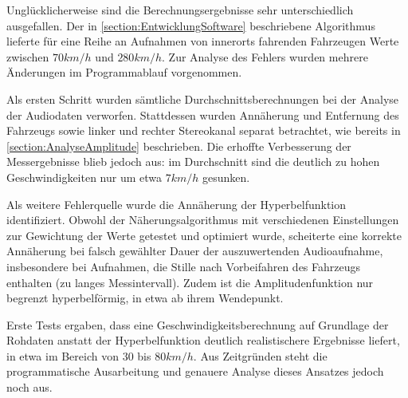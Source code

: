 Unglücklicherweise sind die Berechnungsergebnisse sehr unterschiedlich ausgefallen. Der in \autoref{section:EntwicklungSoftware} beschriebene Algorithmus lieferte für eine Reihe an Aufnahmen von innerorts fahrenden Fahrzeugen Werte zwischen \(70 km/h\) und \(280 km/h\). Zur Analyse des Fehlers wurden mehrere Änderungen im Programmablauf vorgenommen.

Als ersten Schritt wurden sämtliche Durchschnittsberechnungen bei der Analyse der Audiodaten verworfen. Stattdessen wurden Annäherung und Entfernung des Fahrzeugs sowie linker und rechter Stereokanal separat betrachtet, wie bereits in \autoref{section:AnalyseAmplitude} beschrieben. Die erhoffte Verbesserung der Messergebnisse blieb jedoch aus: im Durchschnitt sind die deutlich zu hohen Geschwindigkeiten nur um etwa \(7 km/h\) gesunken.

Als weitere Fehlerquelle wurde die Annäherung der Hyperbelfunktion identifiziert. Obwohl der Näherungsalgorithmus mit verschiedenen Einstellungen zur Gewichtung der Werte getestet und optimiert wurde, scheiterte eine korrekte Annäherung bei falsch gewählter Dauer der auszuwertenden Audioaufnahme, insbesondere bei Aufnahmen, die Stille nach Vorbeifahren des Fahrzeugs enthalten (zu langes Messintervall). Zudem ist die Amplitudenfunktion nur begrenzt hyperbelförmig, in etwa ab ihrem Wendepunkt.

Erste Tests ergaben, dass eine Geschwindigkeitsberechnung auf Grundlage der Rohdaten anstatt der Hyperbelfunktion deutlich realistischere Ergebnisse liefert, in etwa im Bereich von \(30\) bis \(80 km/h\). Aus Zeitgründen steht die programmatische Ausarbeitung und genauere Analyse dieses Ansatzes jedoch noch aus.
